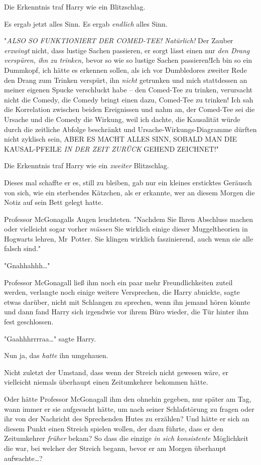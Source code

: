 {Die Erkenntnis traf Harry wie ein Blitzschlag.

Es ergab jetzt alles Sinn. Es ergab \emph{endlich} alles Sinn.

"\emph{ALSO SO FUNKTIONIERT DER COMED-TEE! Natürlich!} Der Zauber \emph{erzwingt} nicht, dass lustige Sachen passieren, er sorgt lässt einen nur \emph{den Drang verspüren, ihn zu trinken,} bevor so wie so lustige Sachen passieren!Ich bin so ein Dummkopf, ich hätte es erkennen sollen, als ich vor Dumbledores zweiter Rede den Drang zum Trinken verspürt, ihn \emph{nicht} getrunken und mich stattdessen an meiner eigenen Spucke verschluckt habe -- den Comed-Tee zu trinken, verursacht nicht die Comedy, die Comedy bringt einen dazu, Comed-Tee zu trinken! Ich sah die Korrelation zwischen beiden Ereignissen und nahm an, der Comed-Tee sei die Ursache und die Comedy die Wirkung, weil ich dachte, die Kausalität würde durch die zeitliche Abfolge beschränkt und Ursache-Wirkungs-Diagramme dürften nicht zyklisch sein, ABER ES MACHT ALLES SINN, SOBALD MAN DIE KAUSAL-PFEILE \emph{IN DER ZEIT ZURÜCK} GEHEND ZEICHNET!"

Die Erkenntnis traf Harry wie ein \emph{zweiter} Blitzschlag.

Dieses mal schaffte er es, still zu bleiben, gab nur ein kleines ersticktes Geräusch von sich, wie ein sterbendes Kätzchen, als er erkannte, wer an diesem Morgen die Notiz auf sein Bett gelegt hatte.

Professor McGonagalls Augen leuchteten. "Nachdem Sie Ihren Abschluss machen oder vielleicht sogar vorher \emph{müssen} Sie wirklich einige dieser Muggeltheorien in Hogwarts lehren, Mr~Potter. Sie klingen wirklich faszinierend, auch wenn sie alle falsch sind."

"Gnahhahhh…"

Professor McGonagall ließ ihm noch ein paar mehr Freundlichkeiten zuteil werden, verlangte noch einige weitere Versprechen, die Harry abnickte, sagte etwas darüber, nicht mit Schlangen zu sprechen, wenn ihn jemand hören könnte und dann fand Harry sich irgendwie vor ihrem Büro wieder, die Tür hinter ihm fest geschlossen.

"Gaahhhrrrraa…" sagte Harry.

Nun ja, das \emph{hatte} ihn umgehauen.

Nicht zuletzt der Umstand, dass wenn der Streich nicht gewesen wäre, er vielleicht niemals überhaupt einen Zeitumkehrer bekommen hätte.

Oder hätte Professor McGonagall ihm den ohnehin gegeben, nur später am Tag, wann immer er sie aufgesucht hätte, um nach seiner Schlafstörung zu fragen oder ihr von der Nachricht des Sprechenden Hutes zu erzählen? Und hätte er sich an diesem Punkt einen Streich spielen wollen, der dazu führte, dass er den Zeitumkehrer \emph{früher} bekam? So dass die einzige \emph{in sich konsistente} Möglichkeit die war, bei welcher der Streich begann, bevor er am Morgen überhaupt aufwachte…?

}
